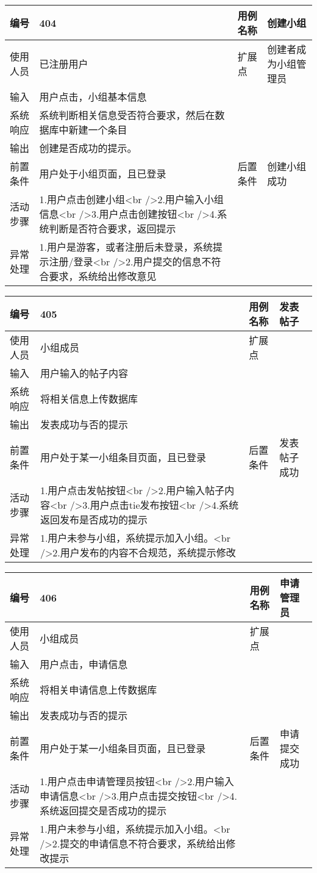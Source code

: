 \documentclass[
]{article}
\begin{document}
\begin{longtable}[]{@{}llll@{}}
\toprule
编号 & 404 & 用例名称 & 创建小组\tabularnewline
\midrule
\endhead
使用人员 & 已注册用户 & 扩展点 & 创建者成为小组管理员\tabularnewline
输入 & 用户点击，小组基本信息 & &\tabularnewline
系统响应 & 系统判断相关信息受否符合要求，然后在数据库中新建一个条目 &
&\tabularnewline
输出 & 创建是否成功的提示。 & &\tabularnewline
前置条件 & 用户处于小组页面，且已登录 & 后置条件 &
创建小组成功\tabularnewline
活动步骤 & 1.用户点击创建小组\textless br
/\textgreater{}2.用户输入小组信息\textless br
/\textgreater{}3.用户点击创建按钮\textless br
/\textgreater{}4.系统判断是否符合要求，返回提示 & &\tabularnewline
异常处理 & 1.用户是游客，或者注册后未登录，系统提示注册/登录\textless br
/\textgreater{}2.用户提交的信息不符合要求，系统给出修改意见 &
&\tabularnewline
\bottomrule
\end{longtable}

\begin{longtable}[]{@{}llll@{}}
\toprule
编号 & 405 & 用例名称 & 发表帖子\tabularnewline
\midrule
\endhead
使用人员 & 小组成员 & 扩展点 &\tabularnewline
输入 & 用户输入的帖子内容 & &\tabularnewline
系统响应 & 将相关信息上传数据库 & &\tabularnewline
输出 & 发表成功与否的提示 & &\tabularnewline
前置条件 & 用户处于某一小组条目页面，且已登录 & 后置条件 &
发表帖子成功\tabularnewline
活动步骤 & 1.用户点击发帖按钮\textless br
/\textgreater{}2.用户输入帖子内容\textless br
/\textgreater{}3.用户点击tie发布按钮\textless br
/\textgreater{}4.系统返回发布是否成功的提示 & &\tabularnewline
异常处理 & 1.用户未参与小组，系统提示加入小组。\textless br
/\textgreater{}2.用户发布的内容不合规范，系统提示修改 & &\tabularnewline
\bottomrule
\end{longtable}

\begin{longtable}[]{@{}llll@{}}
\toprule
编号 & 406 & 用例名称 & 申请管理员\tabularnewline
\midrule
\endhead
使用人员 & 小组成员 & 扩展点 &\tabularnewline
输入 & 用户点击，申请信息 & &\tabularnewline
系统响应 & 将相关申请信息上传数据库 & &\tabularnewline
输出 & 发表成功与否的提示 & &\tabularnewline
前置条件 & 用户处于某一小组条目页面，且已登录 & 后置条件 &
申请提交成功\tabularnewline
活动步骤 & 1.用户点击申请管理员按钮\textless br
/\textgreater{}2.用户输入申请信息\textless br
/\textgreater{}3.用户点击提交按钮\textless br
/\textgreater{}4.系统返回提交是否成功的提示 & &\tabularnewline
异常处理 & 1.用户未参与小组，系统提示加入小组。\textless br
/\textgreater{}2.提交的申请信息不符合要求，系统给出修改提示 &
&\tabularnewline
\bottomrule
\end{longtable}
\end{document}
